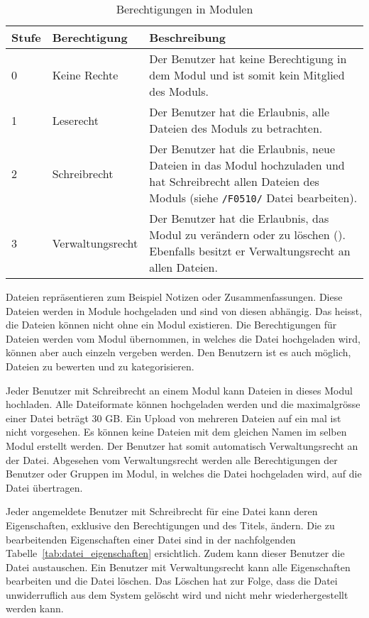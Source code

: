 \begin{table}[H]
\begin{tabularx}{\textwidth}{|l|l|X|} \hline
\textbf{Stufe} & \textbf{Berechtigung}     & \textbf{Beschreibung} \\ \hline
0     & Keine Rechte     & Der Benutzer hat keine Berechtigung in dem Modul und ist somit kein Mitglied des Moduls.\\ \hline
1     & Leserecht        & Der Benutzer hat die Erlaubnis, alle Dateien des Moduls zu betrachten.\\ \hline
2     & Schreibrecht     & Der Benutzer hat die Erlaubnis, neue Dateien in das Modul hochzuladen und hat Schreibrecht allen Dateien des Moduls (siehe \texttt{/F0510/} Datei bearbeiten).\\ \hline
3     & Verwaltungsrecht & Der Benutzer hat die Erlaubnis, das Modul zu verändern oder zu löschen ({Modul bearbeiten}). Ebenfalls besitzt er Verwaltungsrecht an allen Dateien. \\ \hline
\end{tabularx}
\caption{Berechtigungen in Modulen}
\label{tab:modul_rechte}
\end{table}
Dateien repräsentieren zum Beispiel Notizen oder Zusammenfassungen. Diese Dateien werden in Module hochgeladen und sind von diesen abhängig. Das heisst, die Dateien können nicht ohne ein Modul existieren. Die Berechtigungen für Dateien werden vom Modul übernommen, in welches die Datei hochgeladen wird, können aber auch einzeln vergeben werden. Den Benutzern ist es auch möglich, Dateien zu bewerten und zu kategorisieren.

Jeder Benutzer mit Schreibrecht an einem Modul kann Dateien in dieses Modul hochladen. Alle Dateiformate können hochgeladen werden und die maximalgrösse einer Datei beträgt  30 GB. Ein Upload von mehreren Dateien auf ein mal ist nicht vorgesehen. Es können keine Dateien mit dem gleichen Namen im selben Modul erstellt werden. Der Benutzer hat somit automatisch Verwaltungsrecht an der Datei. Abgesehen vom Verwaltungsrecht werden alle Berechtigungen der Benutzer oder Gruppen im Modul, in welches die Datei hochgeladen wird, auf die Datei übertragen.

Jeder angemeldete Benutzer mit Schreibrecht für eine Datei kann deren Eigenschaften, exklusive den Berechtigungen und des Titels, ändern. Die zu bearbeitenden Eigenschaften einer Datei sind in der nachfolgenden Tabelle~\ref{tab:datei_eigenschaften} ersichtlich. Zudem kann dieser Benutzer die Datei austauschen. Ein Benutzer mit Verwaltungsrecht kann alle Eigenschaften bearbeiten und die Datei löschen. Das Löschen hat zur Folge, dass die Datei unwiderruflich aus dem System gelöscht wird und nicht mehr wiederhergestellt werden kann.

